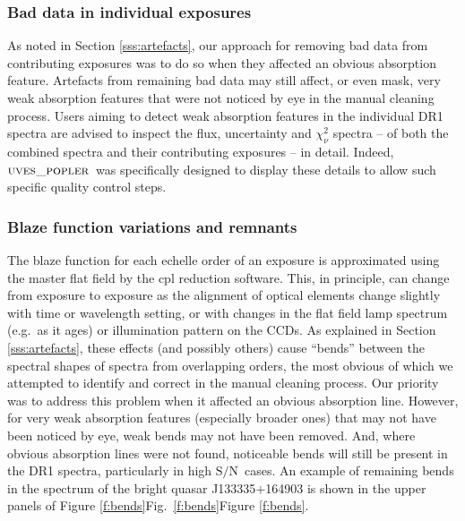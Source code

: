 \documentclass[fleqn,usenatbib,usedcolumn]{mnras}
\newcommand{\Sref}[1]{Section \ref{#1}}
\newcommand{\Fref}[1]{\ifhmode \ifnum\spacefactor=1001 Figure \ref{#1}\else Fig.\ \ref{#1}\fi \else Figure \ref{#1}\fi}
\newcommand{\SN}{\ensuremath{\textrm{S/N}}}
\newcommand{\popler}{\ensuremath{\textsc{uves\_popler}}}
\begin{document}
\subsubsection{Bad data in individual exposures}\label{sss:bad_data}

As noted in \Sref{sss:artefacts}, our approach for removing bad data from contributing exposures was to do so when they affected an obvious absorption feature. Artefacts from remaining bad data may still affect, or even mask, very weak absorption features that were not noticed by eye in the manual cleaning process. Users aiming to detect weak absorption features in the individual DR1 spectra are advised to inspect the flux, uncertainty and $\chi^2_\nu$ spectra -- of both the combined spectra and their contributing exposures -- in detail. Indeed, \popler\ was specifically designed to display these details to allow such specific quality control steps.

\subsubsection{Blaze function variations and remnants}\label{sss:blaze}

The blaze function for each echelle order of an exposure is approximated using the master flat field by the {\sc cpl} reduction software. This, in principle, can change from exposure to exposure as the alignment of optical elements change slightly with time or wavelength setting, or with changes in the flat field lamp spectrum (e.g.\ as it ages) or illumination pattern on the CCDs. As explained in \Sref{sss:artefacts}, these effects (and possibly others) cause ``bends'' between the spectral shapes of spectra from overlapping orders, the most obvious of which we attempted to identify and correct in the manual cleaning process. Our priority was to address this problem when it affected an obvious absorption line. However, for very weak absorption features (especially broader ones) that may not have been noticed by eye, weak bends may not have been removed. And, where obvious absorption lines were not found, noticeable bends will still be present in the DR1 spectra, particularly in high \SN\ cases. An example of remaining bends in the spectrum of the bright quasar J133335$+$164903 is shown in the upper panels of \Fref{f:bends}.
 
\end{document}
